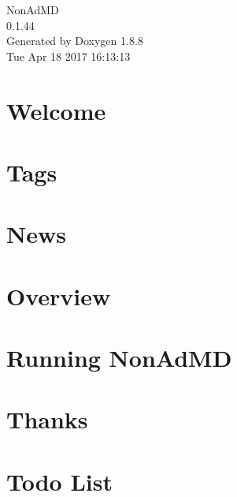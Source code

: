 \documentclass[twoside]{book}
\newcommand{\+}{\discretionary{\mbox{\scriptsize$\hookleftarrow$}}{}{}}
\newcommand{\clearemptydoublepage}{%
  \newpage{\pagestyle{empty}\cleardoublepage}%
}
\begin{document}
\hypersetup{pageanchor=false,
             bookmarks=true,
             bookmarksnumbered=true,
             pdfencoding=unicode
            }
\begin{titlepage}
\vspace*{7cm}
\begin{center}%
{\Large Non\+Ad\+M\+D \\[1ex]\large 0.\+1.\+44 }\\
\vspace*{1cm}
{\large Generated by Doxygen 1.8.8}\\
\vspace*{0.5cm}
{\small Tue Apr 18 2017 16:13:13}\\
\end{center}
\end{titlepage}
\clearemptydoublepage
\tableofcontents
\clearemptydoublepage
{}
\hypersetup{pageanchor=true}

\chapter{Welcome}
\label{index}\hypertarget{index}{}
\chapter{Tags}
\label{_tags}
\hypertarget{_tags}{}

\chapter{News}
\label{_news}
\hypertarget{_news}{}

\chapter{Overview}
\label{_overview}
\hypertarget{_overview}{}

\chapter{Running Non\+Ad\+M\+D}
\label{_interface}
\hypertarget{_interface}{}

\chapter{Thanks}
\label{_thanks}
\hypertarget{_thanks}{}

\chapter{Todo List}
\label{todo}
\hypertarget{todo}{}

\end{document}
